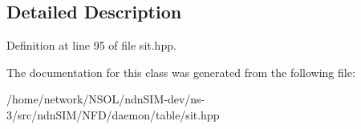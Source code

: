 \subsection{Detailed Description}


Definition at line 95 of file sit.\+hpp.



The documentation for this class was generated from the following file\+:\begin{DoxyCompactItemize}
\item 
/home/network/\+N\+S\+O\+L/ndn\+S\+I\+M-\/dev/ns-\/3/src/ndn\+S\+I\+M/\+N\+F\+D/daemon/table/sit.\+hpp\end{DoxyCompactItemize}
